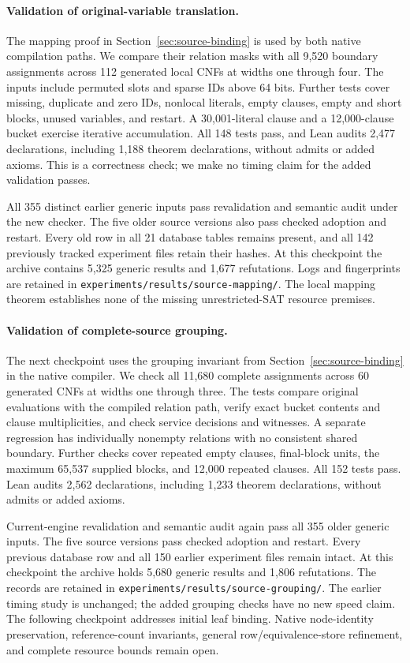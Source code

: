 \documentclass[11pt,a4paper]{article}
\numberwithin{equation}{section}
\theoremstyle{plain}
\theoremstyle{definition}
\theoremstyle{remark}
\begin{document}
\paragraph{Validation of original-variable translation.}
The mapping proof in Section~\ref{sec:source-binding} is used by both native compilation paths. We compare their relation masks with all 9,520 boundary assignments across 112 generated local CNFs at widths one through four. The inputs include permuted slots and sparse IDs above 64 bits. Further tests cover missing, duplicate and zero IDs, nonlocal literals, empty clauses, empty and short blocks, unused variables, and restart. A 30,001-literal clause and a 12,000-clause bucket exercise iterative accumulation. All 148 tests pass, and Lean audits 2,477 declarations, including 1,188 theorem declarations, without admits or added axioms. This is a correctness check; we make no timing claim for the added validation passes.

All 355 distinct earlier generic inputs pass revalidation and semantic audit under the new checker. The five older source versions also pass checked adoption and restart. Every old row in all 21 database tables remains present, and all 142 previously tracked experiment files retain their hashes. At this checkpoint the archive contains 5,325 generic results and 1,677 refutations. Logs and fingerprints are retained in \texttt{experiments/results/source-mapping/}. The local mapping theorem establishes none of the missing unrestricted-SAT resource premises.

\paragraph{Validation of complete-source grouping.}
The next checkpoint uses the grouping invariant from Section~\ref{sec:source-binding} in the native compiler. We check all 11,680 complete assignments across 60 generated CNFs at widths one through three. The tests compare original evaluations with the compiled relation path, verify exact bucket contents and clause multiplicities, and check service decisions and witnesses. A separate regression has individually nonempty relations with no consistent shared boundary. Further checks cover repeated empty clauses, final-block units, the maximum 65,537 supplied blocks, and 12,000 repeated clauses. All 152 tests pass. Lean audits 2,562 declarations, including 1,233 theorem declarations, without admits or added axioms.

Current-engine revalidation and semantic audit again pass all 355 older generic inputs. The five source versions pass checked adoption and restart. Every previous database row and all 150 earlier experiment files remain intact. At this checkpoint the archive holds 5,680 generic results and 1,806 refutations. The records are retained in \texttt{experiments/results/source-grouping/}. The earlier timing study is unchanged; the added grouping checks have no new speed claim. The following checkpoint addresses initial leaf binding. Native node-identity preservation, reference-count invariants, general row/equivalence-store refinement, and complete resource bounds remain open.
\end{document}
